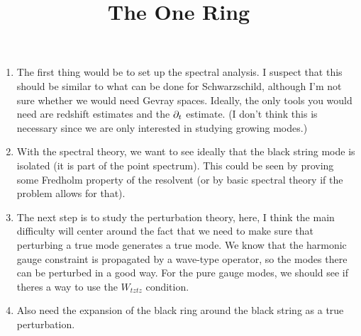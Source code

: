 \documentclass{article}
\title{The One Ring}
\date{}
\begin{document}
\maketitle

\begin{enumerate}
\item The first thing would be to set up the spectral analysis. I
  suspect that this should be similar to what can be done for
  Schwarzschild, although I'm not sure whether we would need Gevray
  spaces. Ideally, the only tools you would need are redshift
  estimates and the $\partial_t$ estimate. (I don't think this is necessary
  since we are only interested in studying growing modes.)
\item With the spectral theory, we want to see ideally that the black
  string mode is isolated (it is part of the point spectrum). This
  could be seen by proving some Fredholm property of the resolvent (or
  by basic spectral theory if the problem allows for that).
\item The next step is to study the perturbation theory, here, I think
  the main difficulty will center around the fact that we need to make
  sure that perturbing a true mode generates a true mode. We know that
  the harmonic gauge constraint is propagated by a wave-type operator,
  so the modes there can be perturbed in a good way. For the pure
  gauge modes, we should see if theres a way to use the $W_{tztz}$
  condition.
\item Also need the expansion of the black ring around the black
  string as a true perturbation.
\end{enumerate}
\end{document}

